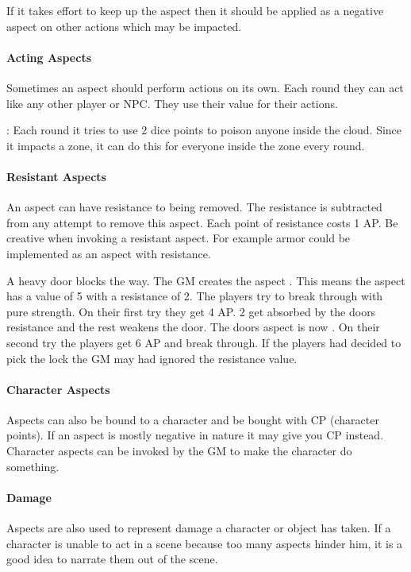\documentclass[11pt]{article}
\begin{document}
{If it takes effort to keep up the aspect then it should be applied as a negative aspect on other actions which may be impacted.
\paragraph*{Acting Aspects}
\label{sec:org036b830}

Sometimes an aspect should perform actions on its own. Each round they can act like any other player or NPC. They use their value for their actions.

\begin{pwexample}
: Each round it tries to use 2 dice points to poison anyone inside the cloud. Since it impacts a zone, it can do this for everyone inside the zone every round.
\end{pwexample}
\paragraph*{Resistant Aspects}
\label{sec:org034cc47}
An aspect can have resistance to being removed. The resistance is subtracted from any attempt to remove this aspect. Each point of resistance costs 1 AP. Be creative when invoking a resistant aspect. For example armor could be implemented as an aspect with resistance.

\begin{pwexample}
A heavy door blocks the way. The GM creates the aspect . This means the aspect has a value of 5 with a resistance of 2. The players try to break through with pure strength. On their first try they get 4 AP. 2 get absorbed by the doors resistance and the rest weakens the door. The doors aspect is now . On their second try the players get 6 AP and break through.
If the players had decided to pick the lock the GM may had ignored the resistance value.
\end{pwexample}
\paragraph*{Character Aspects}
\label{sec:org88da446}

Aspects can also be bound to a character and be bought with CP (character points). If an aspect is mostly negative in nature it may give you CP instead. Character aspects can be invoked by the GM to make the character do something. 
\paragraph*{Damage}
\label{sec:orgb925aaf}
Aspects are also used to represent damage a character or object has taken. If a character is unable to act in a scene because too many aspects hinder him, it is a good idea to narrate them out of the scene.

}
\end{document}
